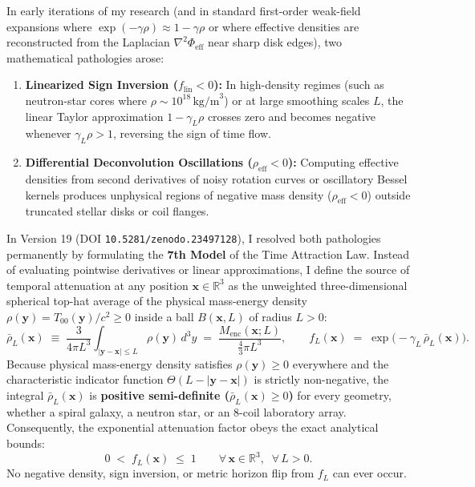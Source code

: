 \documentclass[10pt,a4paper]{article}
\begin{document}
\par
In early iterations of my research (and in standard first-order weak-field expansions where $\exp(-\gamma\rho) \approx 1 - \gamma\rho$ or where effective densities are reconstructed from the Laplacian $\nabla^2\Phi_{\text{eff}}$ near sharp disk edges), two mathematical pathologies arose:
\begin{enumerate}\setlength{\itemsep}{1pt}\setlength{\parskip}{0pt}\setlength{\topsep}{1pt}
  \item \textbf{Linearized Sign Inversion ($f_{\text{lin}} < 0$):} In high-density regimes (such as neutron-star cores where $\rho \sim 10^{18}\,\text{kg/m}^3$) or at large smoothing scales $L$, the linear Taylor approximation $1 - \gamma_L\rho$ crosses zero and becomes negative whenever $\gamma_L\rho > 1$, reversing the sign of time flow.
  \item \textbf{Differential Deconvolution Oscillations ($\rho_{\text{eff}} < 0$):} Computing effective densities from second derivatives of noisy rotation curves or oscillatory Bessel kernels produces unphysical regions of negative mass density ($\rho_{\text{eff}} < 0$) outside truncated stellar disks or coil flanges.
\end{enumerate}

\par
In Version 19 (DOI \texttt{10.5281/zenodo.23497128}), I resolved both pathologies permanently by formulating the \textbf{7th Model} of the Time Attraction Law. Instead of evaluating pointwise derivatives or linear approximations, I define the source of temporal attenuation at any position $\mathbf{x} \in \mathbb{R}^3$ as the unweighted three-dimensional spherical top-hat average of the physical mass-energy density $\rho(\mathbf{y}) = T_{00}(\mathbf{y})/c^2 \ge 0$ inside a ball $B(\mathbf{x},L)$ of radius $L > 0$:
\begin{equation}
  \bar{\rho}_L(\mathbf{x}) \;\equiv\; \frac{3}{4\pi L^3}\int_{|\mathbf{y}-\mathbf{x}|\le L} \rho(\mathbf{y})\,d^3y \;=\; \frac{M_{\text{enc}}(\mathbf{x};L)}{\frac{4}{3}\pi L^3}, \qquad
  f_L(\mathbf{x}) \;=\; \exp\!\bigl(-\gamma_L\,\bar{\rho}_L(\mathbf{x})\bigr).
\end{equation}
Because physical mass-energy density satisfies $\rho(\mathbf{y}) \ge 0$ everywhere and the characteristic indicator function $\Theta(L - |\mathbf{y}-\mathbf{x}|)$ is strictly non-negative, the integral $\bar{\rho}_L(\mathbf{x})$ is \textbf{positive semi-definite ($\bar{\rho}_L(\mathbf{x}) \ge 0$)} for every geometry, whether a spiral galaxy, a neutron star, or an 8-coil laboratory array. Consequently, the exponential attenuation factor obeys the exact analytical bounds:
\begin{equation}
  0 \;<\; f_L(\mathbf{x}) \;\le\; 1 \qquad \forall\,\mathbf{x}\in\mathbb{R}^3,\;\;\forall\,L > 0.
\end{equation}
No negative density, sign inversion, or metric horizon flip from $f_L$ can ever occur.
\end{document}
